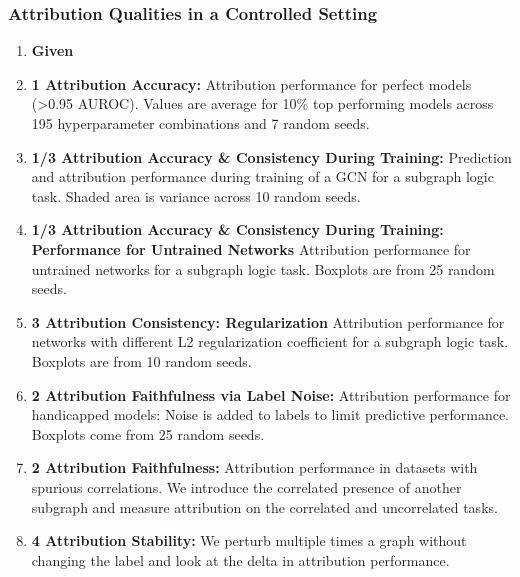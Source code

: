 \subsubsection{Attribution Qualities in a Controlled Setting}
\begin{example}
    \begin{enumerate}
        \item \textbf{Given}
        \item \textbf{1 Attribution Accuracy:} Attribution performance for perfect models (>0.95 AUROC). Values are average for 10\% top performing models across 195 hyperparameter combinations and 7 random seeds.
        \item \textbf{1/3 Attribution Accuracy \& Consistency During Training:} Prediction and attribution performance during training of a GCN for a subgraph logic task. Shaded area is variance across 10 random seeds. 
        \item \textbf{1/3 Attribution Accuracy \& Consistency During Training: Performance for Untrained Networks} Attribution performance for untrained networks for a subgraph logic task. Boxplots are from 25 random seeds. 
        \item \textbf{3 Attribution Consistency: Regularization} Attribution performance for networks with different L2 regularization coefficient for a subgraph logic task. Boxplots are from 10 random seeds. 
        \item \textbf{2 Attribution Faithfulness via Label Noise:} Attribution performance for handicapped models: Noise is added to labels to limit predictive performance. Boxplots come from 25 random seeds.
        \item \textbf{2 Attribution Faithfulness:} Attribution performance in datasets with spurious correlations. We introduce the correlated presence of another subgraph and measure attribution on the correlated and uncorrelated tasks. 
        \item \textbf{4 Attribution Stability:} We perturb multiple times a graph without changing the label and look at the delta in attribution performance. 
    \end{enumerate}
\end{example}
\newpage


